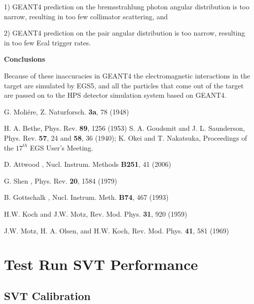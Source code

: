 1) GEANT4 prediction on the bremsstrahlung photon angular distribution is too narrow, 
resulting in too few collimator scattering, and

2) GEANT4 prediction on the pair angular distribution is too narrow, resulting in 
too few Ecal trigger rates.

\vspace{1cm}
\noindent
{\bf Conclusions}

Because of these inaccuracies in GEANT4 the electromagnetic interactions in the target are simulated 
by EGS5, and all the particles that come out of the target are passed on to the HPS detector 
simulation system based on GEANT4.


\begin{thebibliography}{99}
G. Moli\'{e}re, Z. Naturforsch. {\bf 3a}, 78 (1948)

H. A. Bethe, Phys. Rev. {\bf 89}, 1256 (1953)
S. A. Goudsmit and J. L. Saunderson, Phys. Rev. {\bf 57}, 24 and {\bf 58}, 36 (1940);
K. Okei and T. Nakatsuka, Proceedings of the $17^{th}$ EGS User's Meeting.

D. Attwood \etal, Nucl. Instrum. Methods {\bf B251}, 41 (2006)

G. Shen \etal, Phys. Rev. {\bf 20}, 1584 (1979)

B. Gottschalk \etal, Nucl. Instrum. Meth. {\bf B74}, 467 (1993)

H.W. Koch and J.W. Motz, Rev. Mod. Phys. {\bf 31}, 920 (1959)

J.W. Motz, H. A. Olsen, and H.W. Koch, Rev. Mod. Phys. {\bf 41}, 581 (1969)

\end{thebibliography}

\section{Test Run SVT Performance}
\subsection*{SVT Calibration}



